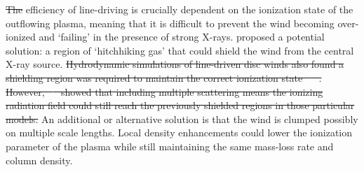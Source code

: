 \documentclass[useAMS,usenatbib]{mn2e_x}
\providecommand{\DIFadd}[1]{{\protect\color{blue}\uwave{#1}}} %
\providecommand{\DIFdel}[1]{{\protect\color{red}\sout{#1}}}                      %
\providecommand{\DIFaddbegin}{} %
\providecommand{\DIFaddend}{} %
\providecommand{\DIFdelbegin}{} %
\providecommand{\DIFdelend}{} %
\begin{document}
\DIFdel{The }\DIFdelend %
\DIFaddbegin \DIFadd{The }\DIFaddend efficiency of line-driving is crucially dependent on the ionization state 
of the outflowing plasma, meaning that it is difficult to prevent 
the wind becoming over-ionized and `failing' in the presence of strong X-rays. 
\cite{MCGV95} proposed a potential solution: 
a region of `hitchhiking gas' that could shield the wind from the central X-ray source. 
\DIFdelbegin \DIFdel{Hydrodynamic simulations of line-driven disc winds also found a shielding region
was required to maintain the correct ionization state \mbox{%
\citep{PSK2000,PK04}
}%
. 
However, \mbox{%
\cite{H14}
}%
showed that including multiple scattering means the ionizing radiation 
field could still reach the previously shielded regions in those particular models.
}\DIFdelend %
An additional or alternative solution is that the wind is clumped \citep[e.g.][]{hamann2013}
possibly on multiple scale lengths. Local density enhancements could lower the 
ionization parameter of the plasma while still maintaining the same mass-loss 
rate and column density. 
\end{document}
